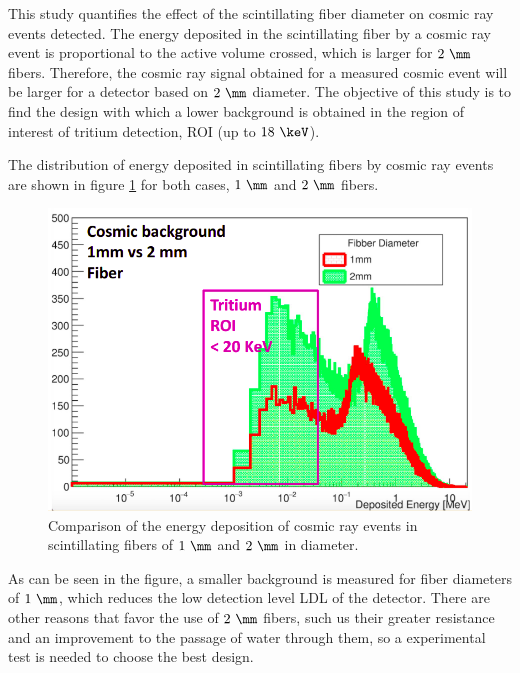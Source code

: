 This study quantifies the effect of the scintillating fiber diameter on cosmic ray events detected. The energy deposited in the scintillating fiber by a cosmic ray event is proportional to the active volume crossed, which is larger for $2~\mm$ fibers. Therefore, the cosmic ray signal obtained for a measured cosmic event will be larger for a detector based on $2~\mm$ diameter. The objective of this study is to find the design with which a lower background is obtained in the region of interest of tritium detection, ROI (up to $18~\keV$).

The distribution of energy deposited in scintillating fibers by cosmic ray events are shown in figure \ref{fig:DiameterComparison} for both cases, $1~\mm$ and $2~\mm$ fibers.

\begin{figure}[hbtp]
\centering
\includegraphics[scale=0.4]{Figures/8SimulationsResults/81TRITIUMDesign/814Diameter/ComparisonDiameter.png}
\caption{Comparison of the energy deposition of cosmic ray events in scintillating fibers of $1~\mm$ and $2~\mm$ in diameter.\label{fig:DiameterComparison}}
\end{figure}

As can be seen in the figure, a smaller background is measured for fiber diameters of $1~\mm$, which reduces the low detection level LDL of the detector. There are other reasons that favor the use of $2~\mm$ fibers, such us their greater resistance and an improvement to the passage of water through them, so a experimental test is needed to choose the best design.


